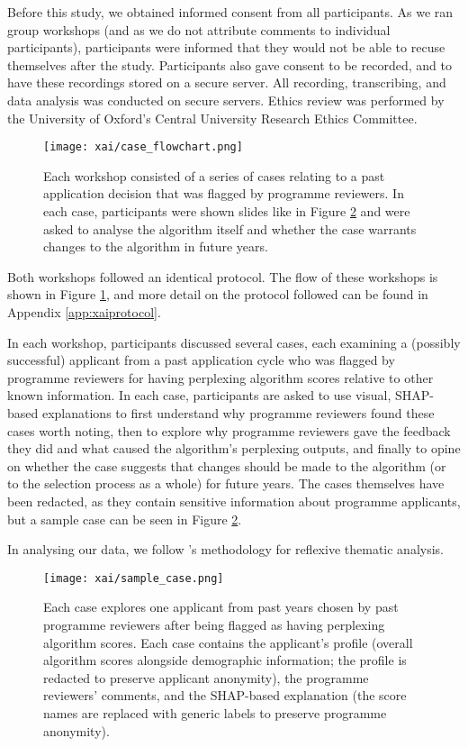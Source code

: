 Before this study, we obtained informed consent from all participants. As we ran group workshops (and as we do not attribute comments to individual participants), participants were informed that they would not be able to recuse themselves after the study. Participants also gave consent to be recorded, and to have these recordings stored on a secure server. All recording, transcribing, and data analysis was conducted on secure servers. Ethics review was performed by the University of Oxford's Central University Research Ethics Committee.

\begin{figure}[htbp]
    \centering
    \texttt{[image: xai/case\_flowchart.png]}
    \caption{Each workshop consisted of a series of cases relating to a past application decision that was flagged by programme reviewers. In each case, participants were shown slides like in Figure \ref{fig:sample_case} and were asked to analyse the algorithm itself and whether the case warrants changes to the algorithm in future years.}
    \label{fig:case_flowchart}
\end{figure}

Both workshops followed an identical protocol. The flow of these workshops is shown in Figure \ref{fig:case_flowchart}, and more detail on the protocol followed can be found in Appendix \ref{app:xaiprotocol}.

In each workshop, participants discussed several cases, each examining a (possibly successful) applicant from a past application cycle who was flagged by programme reviewers for having perplexing algorithm scores relative to other known information. In each case, participants are asked to use visual, SHAP-based explanations to first understand why programme reviewers found these cases worth noting, then to explore why programme reviewers gave the feedback they did and what caused the algorithm's perplexing outputs, and finally to opine on whether the case suggests that changes should be made to the algorithm (or to the selection process as a whole) for future years. The cases themselves have been redacted, as they contain sensitive information about programme applicants, but a sample case can be seen in Figure \ref{fig:sample_case}.

In analysing our data, we follow \textcite{braun_using_2006}'s methodology for reflexive thematic analysis. 

\begin{figure}[htbp]
    \centering
    \texttt{[image: xai/sample\_case.png]}
    \caption{Each case explores one applicant from past years chosen by past programme reviewers after being flagged as having perplexing algorithm scores. Each case contains the applicant's profile (overall algorithm scores alongside demographic information; the profile is redacted to preserve applicant anonymity), the programme reviewers' comments, and the SHAP-based explanation (the score names are replaced with generic labels to preserve programme anonymity).}
    \label{fig:sample_case}
    
\end{figure}

